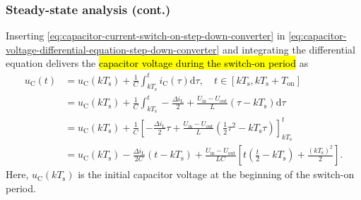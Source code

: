 \begin{frame}
    \frametitle{Steady-state analysis (cont.)}
    Inserting \eqref{eq:capacitor-current-switch-on-step-down-converter} in \eqref{eq:capacitor-voltage-differential-equation-step-down-converter} and integrating the differential equation delivers the \hl{capacitor voltage during the switch-on period} as
    \begin{equation}
        \begin{split}
            u_\mathrm{C}(t) &= u_\mathrm{C}(k T_\mathrm{s}) + \frac{1}{C}\int_{k T_\mathrm{s}}^t i_\mathrm{C}(\tau) \mathrm{d}\tau , \quad t\in [k T_\mathrm{s}, k T_\mathrm{s} + T_\mathrm{on}]\\
            &= u_\mathrm{C}(k T_\mathrm{s}) + \frac{1}{C}\int_{k T_\mathrm{s}}^t -\frac{\Delta i_\mathrm{L}}{2} + \frac{U_\mathrm{in}-U_\mathrm{out}}{L} (\tau -k T_\mathrm{s}) \mathrm{d}\tau\\
            &=u_\mathrm{C}(k T_\mathrm{s}) + \frac{1}{C} \left[-\frac{\Delta i_\mathrm{L}}{2}\tau + \frac{U_\mathrm{in}-U_\mathrm{out}}{L} (\frac{1}{2}\tau^2 -k T_\mathrm{s}\tau)\right]_{k T_\mathrm{s}}^t\\
            &=u_\mathrm{C}(k T_\mathrm{s}) - \frac{\Delta i_\mathrm{L}}{2 C}(t- kT_\mathrm{s}) + \frac{U_\mathrm{in}-U_\mathrm{out}}{LC} \left[t(\frac{t}{2}-kT_\mathrm{s}) + \frac{(kT_\mathrm{s})^2}{2}\right].
        \end{split}
        \label{eq:capacitor-voltage-switch-on-step-down-converter}
    \end{equation}
    Here, $u_\mathrm{C}(k T_\mathrm{s})$ is the initial capacitor voltage at the beginning of the switch-on period.
\end{frame}

